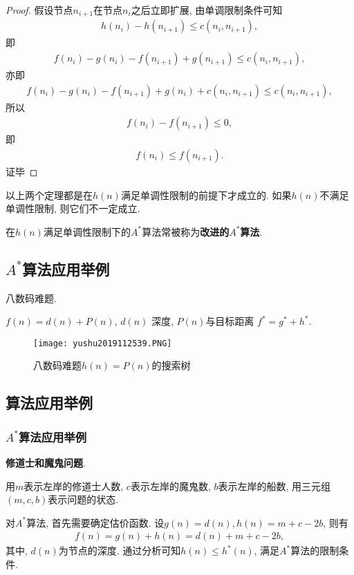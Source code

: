 \begin{proof}
假设节点$n_{i+1}$在节点$n_i$之后立即扩展, 由单调限制条件可知
\begin{align}
  h(n_i)-h(n_{i+1} )\leq c(n_i , n_{i+1}),
\end{align}
即
\begin{align}
  f(n_i)-g(n_i )-f(n_{i+1} )+g(n_{i+1} )\leq c(n_i , n_{i+1} ),
\end{align}
亦即
\begin{align}
  f(n_i)-g(n_i )-f(n_{i+1} )+g(n_i )+c(n_i , n_{i+1} )\leq c(n_i , n_{i+1} ),
\end{align}
所以
\begin{align}
  f(n_i)-f(n_{i+1} )\leq 0,
\end{align}
即
\begin{align}
  f(n_i)\leq f(n_{i+1}).
\end{align}
证毕
\end{proof}
\begin{remark}
  以上两个定理都是在$h(n)$满足单调性限制的前提下才成立的. 如果$h(n)$不满足单调性限制, 则它们不一定成立.
\end{remark}
在$h(n)$满足单调性限制下的$A^*$算法常被称为\textbf{改进的$A^*$算法}.
\subsection{$A^*$算法应用举例}
\begin{example}
  八数码难题.
\end{example}
$f(n)=d(n)+P(n)$, $d(n)$ 深度, $P(n)$与目标距离 $f^*=g^*+h^*$.
\begin{figure}[H]
\centering
\texttt{[image: yushu2019112539.PNG]}
\caption{八数码难题$h(n)=P(n)$的搜索树}
\label{AI32fig39}
\end{figure}
\subsection{算法应用举例}
\subsubsection{$A^*$算法应用举例}
\begin{example}
  \textbf{修道士和魔鬼问题}.
\end{example}
\begin{result}
用$m$表示左岸的修道士人数, $c$表示左岸的魔鬼数, $b$表示左岸的船数, 用三元组$(m, c, b)$表示问题的状态.

对$A^*$算法, 首先需要确定估价函数. 设$g(n)=d(n), h(n)=m+c-2b$, 则有
\begin{align}
  f(n)=g(n)+h(n)=d(n)+m+c-2b,
\end{align}
其中, $d(n)$为节点的深度. 通过分析可知$h(n)\leq h^*(n)$, 满足$A^*$算法的限制条件.
\end{result}


